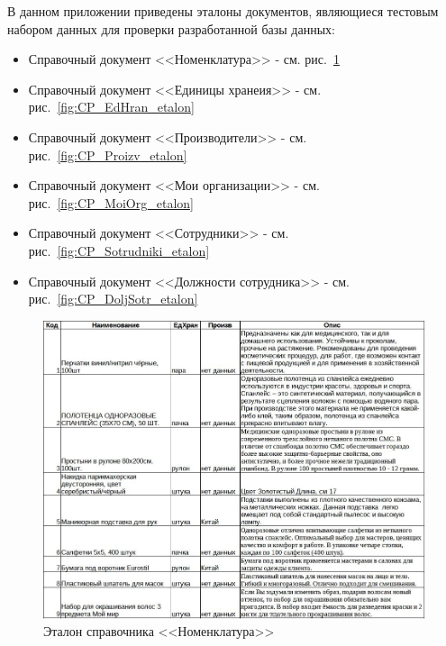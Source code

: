 \documentclass[12pt, a4paper, simple]{eskdtext}
\begin{document}
    

    \thispagestyle{plain}
    \pagestyle{plain}
    \hspace{0pt}

    В данном приложении приведены эталоны документов,
    являющиеся тестовым набором данных для проверки разработанной базы данных:

    \begin{itemize}
        \item Справочный документ <<Номенклатура>> - см. рис.~\ref{fig:CP_Nomenclatura_etalon}
        \item Справочный документ <<Единицы хранеия>> - см. рис.~\ref{fig:CP_EdHran_etalon}
        \item Справочный документ <<Производители>> - см. рис.~\ref{fig:CP_Proizv_etalon}
        \item Справочный документ <<Мои организации>> - см. рис.~\ref{fig:CP_MoiOrg_etalon}
        \item Справочный документ <<Сотрудники>> - см. рис.~\ref{fig:CP_Sotrudniki_etalon}
        \item Справочный документ <<Должности сотрудника>> - см. рис.~\ref{fig:CP_DoljSotr_etalon}
    \end{itemize}

    \begin{figure}[!h]
        \centering
        \includegraphics[width=16cm]
            {_docs/СП_Номенкл_эталон.jpg}
        \caption{Эталон справочника <<Номенклатура>>}
        \label{fig:CP_Nomenclatura_etalon}
    \end{figure}
    
\end{document}
